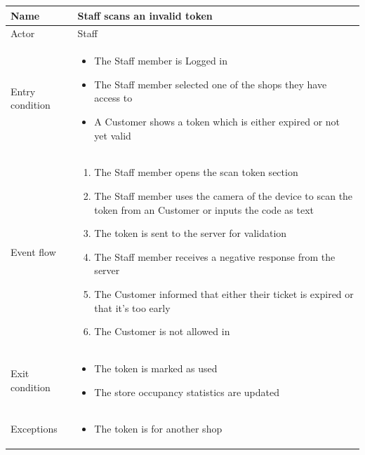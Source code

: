 \begin{table}[H]
    \begin{tabu} to \textwidth {|X|X[4]|}
        \hline
        Name            & Staff scans an invalid token \\ \hline
        Actor           & Staff                        \\ \hline
        Entry condition & \begin{itemize}
            \item The Staff member is Logged in
            \item The Staff member selected one of the shops they have access to
            \item A Customer shows a token which is either expired or not yet valid
        \end{itemize}   \\ \hline
        Event flow      & \begin{enumerate}
            \item The Staff member opens the scan token section
            \item The Staff member uses the camera of the device to scan the token from an Customer or inputs the code as text
            \item The token is sent to the server for validation
            \item The Staff member receives a negative response from the server
            \item The Customer informed that either their ticket is expired or that it's too early
            \item The Customer is not allowed in
        \end{enumerate}   \\ \hline
        Exit condition  & \begin{itemize}
            \item The token is marked as used
            \item The store occupancy statistics are updated
        \end{itemize}   \\ \hline
        Exceptions      & \begin{itemize}
            \item The token is for another shop
        \end{itemize}   \\ \hline
    \end{tabu}
\end{table}

